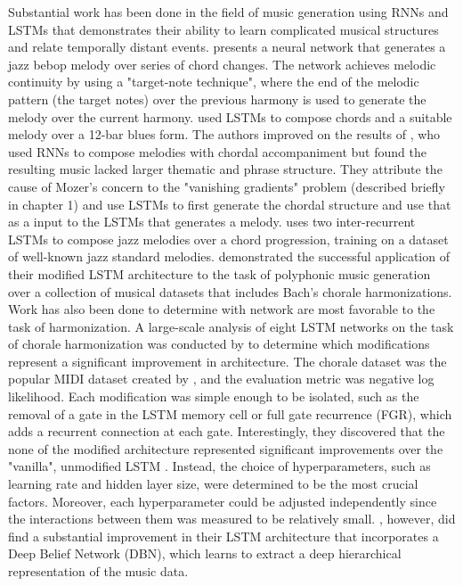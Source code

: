 \documentclass[11pt]{article}
\begin{document}
Substantial work has been done in the field of music generation using RNNs and LSTMs that demonstrates their ability to learn complicated musical structures and relate temporally distant events. \citet{petri1995bebop} presents a neural network that generates a jazz bebop melody over series of chord changes. The network achieves melodic continuity by using a "target-note technique", where the end of the melodic pattern (the target notes) over the previous harmony is used to generate the melody over the current harmony. \citet{eck2002structure} used LSTMs to compose chords and a suitable melody over a 12-bar blues form. The authors improved on the results of \citet{mozer1994neural}, who used RNNs to compose melodies with chordal accompaniment but found the resulting music lacked larger thematic and phrase structure. They attribute the cause of Mozer's concern to the "vanishing gradients" problem (described briefly in chapter 1) and use LSTMs to first generate the chordal structure and use that as a input to the LSTMs that generates a melody. \citet{franklin2006jazz} uses two inter-recurrent LSTMs to compose jazz melodies over a chord progression, training on a dataset of well-known jazz standard melodies. \citet{goel2014polyphonic} demonstrated the successful application of their modified LSTM architecture to the task of polyphonic music generation over a collection of musical datasets that includes Bach's chorale harmonizations. \\

Work has also been done to determine with network are most favorable to the task of harmonization.  A large-scale analysis of eight LSTM networks on the task of chorale harmonization was conducted by \citet{greff2015lstm} to determine which modifications represent a significant improvement in architecture. The chorale dataset was the popular MIDI dataset created by \citet{allan2005harmonising}, and the evaluation metric was negative log likelihood. Each modification was simple enough to be isolated, such as the removal of a gate in the LSTM memory cell or full gate recurrence (FGR), which adds a recurrent connection at each gate. Interestingly, they discovered that the none of the modified architecture represented significant improvements over the "vanilla", unmodified LSTM \citep[p.~7]{greff2015lstm}. Instead, the choice of hyperparameters, such as learning rate and hidden layer size, were determined to be the most crucial factors. Moreover, each hyperparameter could be adjusted independently since the interactions between them was measured to be relatively small. \citet{goel2014polyphonic}, however, did find a substantial improvement in their LSTM architecture that incorporates a Deep Belief Network (DBN), which learns to extract a deep hierarchical representation of the music data. \\
\end{document}
